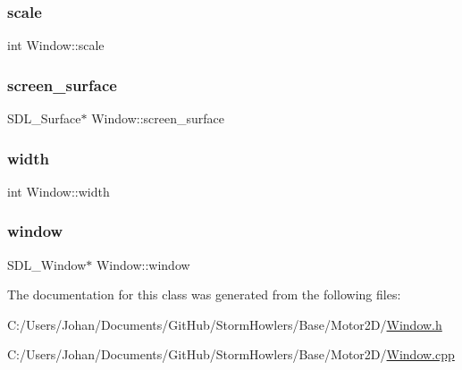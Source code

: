 \subsubsection{\texorpdfstring{scale}{scale}}
{\footnotesize\ttfamily int Window\+::scale}

\mbox{\label{class_window_a713df53f14819f78c3845d9313b27064}} 
\subsubsection{\texorpdfstring{screen\_surface}{screen\_surface}}
{\footnotesize\ttfamily S\+D\+L\+\_\+\+Surface$\ast$ Window\+::screen\+\_\+surface}

\mbox{\label{class_window_af5b1c436782cc9752d386493fbc5dc8c}} 
\subsubsection{\texorpdfstring{width}{width}}
{\footnotesize\ttfamily int Window\+::width}

\mbox{\label{class_window_ae39a7755a5a6ab74bcbdbe3e2e206820}} 
\subsubsection{\texorpdfstring{window}{window}}
{\footnotesize\ttfamily S\+D\+L\+\_\+\+Window$\ast$ Window\+::window}



The documentation for this class was generated from the following files\+:\begin{DoxyCompactItemize}
\item 
C\+:/\+Users/\+Johan/\+Documents/\+Git\+Hub/\+Storm\+Howlers/\+Base/\+Motor2\+D/\mbox{\hyperlink{_window_8h}{Window.\+h}}\item 
C\+:/\+Users/\+Johan/\+Documents/\+Git\+Hub/\+Storm\+Howlers/\+Base/\+Motor2\+D/\mbox{\hyperlink{_window_8cpp}{Window.\+cpp}}\end{DoxyCompactItemize}
